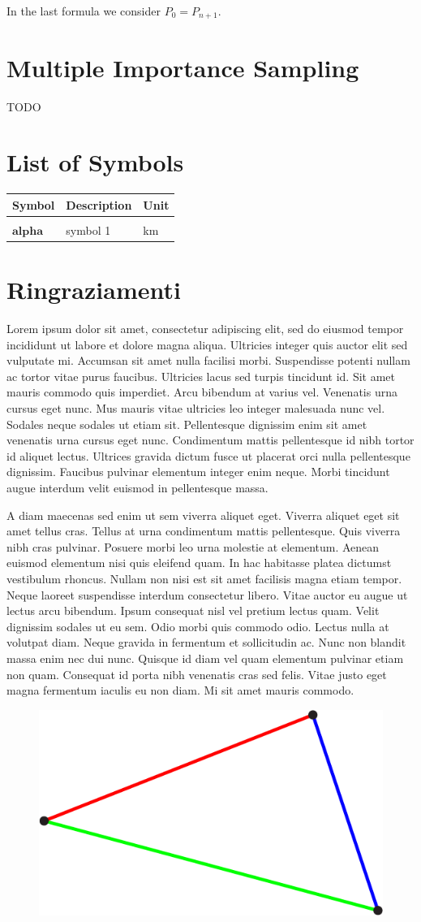\documentclass{PoliMi_MasterThesis}
\newcommand*\triangleLogo{
	\clearpage
	\thispagestyle{empty}
	\newpage
	\begin{figure}
		\centering
		\includegraphics[width=\textwidth]{Images/triangle_logo_thin.png} 
	\end{figure}
}
\begin{document}
In the last formula we consider $P_0 = P_{n+1}$.

\chapter{Multiple Importance Sampling} \label{ch:mis}
TODO

\listoffigures
\listoftables



\chapter*{List of Symbols} %
\begin{table}[H]
    \centering
    \begin{tabular}{lll}
        \textbf{Symbol} & \textbf{Description} & \textbf{Unit} \\\hline\\[-9px]
        $\bm{alpha}$ & symbol 1 & km \\[2px]
    \end{tabular}
\end{table}

\chapter*{Ringraziamenti}
\small
Lorem ipsum dolor sit amet, consectetur adipiscing elit, sed do eiusmod tempor incididunt ut labore et dolore magna aliqua. Ultricies integer quis auctor elit sed vulputate mi. Accumsan sit amet nulla facilisi morbi. Suspendisse potenti nullam ac tortor vitae purus faucibus. Ultricies lacus sed turpis tincidunt id. Sit amet mauris commodo quis imperdiet. Arcu bibendum at varius vel. Venenatis urna cursus eget nunc. Mus mauris vitae ultricies leo integer malesuada nunc vel. Sodales neque sodales ut etiam sit. Pellentesque dignissim enim sit amet venenatis urna cursus eget nunc. Condimentum mattis pellentesque id nibh tortor id aliquet lectus. Ultrices gravida dictum fusce ut placerat orci nulla pellentesque dignissim. Faucibus pulvinar elementum integer enim neque. Morbi tincidunt augue interdum velit euismod in pellentesque massa.

A diam maecenas sed enim ut sem viverra aliquet eget. Viverra aliquet eget sit amet tellus cras. Tellus at urna condimentum mattis pellentesque. Quis viverra nibh cras pulvinar. Posuere morbi leo urna molestie at elementum. Aenean euismod elementum nisi quis eleifend quam. In hac habitasse platea dictumst vestibulum rhoncus. Nullam non nisi est sit amet facilisis magna etiam tempor. Neque laoreet suspendisse interdum consectetur libero. Vitae auctor eu augue ut lectus arcu bibendum. Ipsum consequat nisl vel pretium lectus quam. Velit dignissim sodales ut eu sem. Odio morbi quis commodo odio. Lectus nulla at volutpat diam. Neque gravida in fermentum et sollicitudin ac. Nunc non blandit massa enim nec dui nunc. Quisque id diam vel quam elementum pulvinar etiam non quam. Consequat id porta nibh venenatis cras sed felis. Vitae justo eget magna fermentum iaculis eu non diam. Mi sit amet mauris commodo.
\normalsize

\ClearShipoutPicture

\triangleLogo
\end{document}
